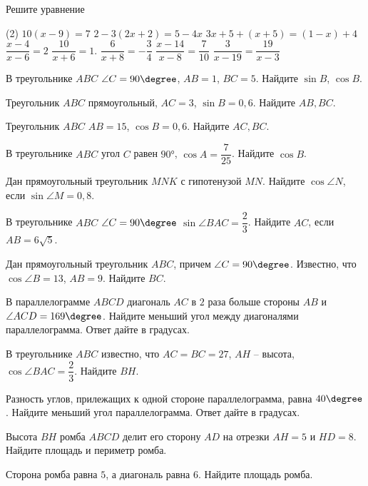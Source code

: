 \begin{class}[number=5]
	\begin{listofex}
		\item Решите уравнение 
		\begin{tasks}(2)
			\task \( 10 (x-9) =7 \)
			\task \( 2-3(2x+2)=5-4x \)
			\task \( 3x + 5 +(x+5) = (1-x) + 4 \)
			\task \( \dfrac{x-4}{x-6} =2 \)  
			\task \( \dfrac{ 10}{x+6} =1.  \) 
			\task \( \dfrac{6}{x+8} = - \dfrac{3}{4}\) 
			\task \( \dfrac{ x-14}{x-8} = \dfrac{7}{10} \)
			\task \( \dfrac{3}{x-19} =  \dfrac{19}{x-3}  \)
		\end{tasks} 
		\item В треугольнике \( ABC\) \( \angle C = 90\degree \), \(  AB = 1 \), \( BC = 5 \). Найдите \( \sin B \), \( \cos B \).
		\item  Треугольник \( ABC \) прямоугольный, \( AC = 3 \),  \( \sin B = 0,6 \).  Найдите \(AB, BC \).
		\item Треугольник \( ABC \)  \( AB = 15 \), \( \cos B = 0,6 \). Найдите \( AC, BC \).
		\item В треугольнике \( ABC \) угол \( C \) равен \( 90° \),  \( \cos A =  \dfrac{7}{25} \).  Найдите  \( \cos B \).
		\item Дан прямоугольный треугольник \( MNK \) с гипотенузой \( MN \). Найдите \( \cos⁡\angle N \), если \( \sin⁡\angle M=0,8 \).
		\item В треугольнике \( ABC \) \( \angle C=90\degree \) \( \sin\angle BAC=\dfrac{2}{3} \). Найдите \( AC \), если \( AB=6\sqrt{5} \).
		\item Дан прямоугольный треугольник \( ABC \), причем \( \angle C=90\degree \). Известно, что \( \cos⁡\angle B=13 \), \( AB=9 \). Найдите \( BC \).
		\item В параллелограмме \( ABCD \) диагональ \( AC \) в \( 2 \) раза больше стороны \( AB \) и \( \angle ACD=169\degree \). Найдите меньший угол между диагоналями параллелограмма. Ответ дайте в градусах.
		\item В треугольнике \( ABC \) известно, что \( AC=BC=27 \), \( AH  \) – высота, \( \cos\angle BAC=\dfrac{2}{3} \). Найдите \( BH \).
		\item Разность углов, прилежащих к одной стороне параллелограмма, равна \( 40\degree \). Найдите меньший угол параллелограмма. Ответ дайте в градусах.
		\item Высота \( BH \) ромба \( ABCD \) делит его сторону \( AD \) на отрезки \( AH  =  5 \) и \( HD  =  8 \). Найдите площадь и периметр ромба.
		\item Сторона ромба равна \( 5 \), а диагональ равна \( 6 \). Найдите площадь ромба.
	\end{listofex}
\end{class}

